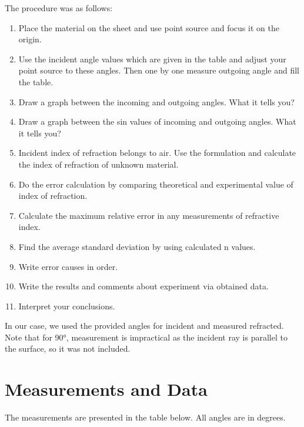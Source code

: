 \documentclass[12pt, a4paper]{article}
\begin{document}
The procedure was as follows:
\begin{enumerate}
\item Place the material on the sheet and use point source and focus it on the origin.
\item Use the incident angle values which are given in the table and adjust your point source to these angles. Then one by one measure outgoing angle and fill the table.
\item Draw a graph between the incoming and outgoing angles. What it tells you?
\item Draw a graph between the sin values of incoming and outgoing angles. What it tells you?
\item Incident index of refraction belongs to air. Use the formulation and calculate the index of refraction of unknown material.
\item Do the error calculation by comparing theoretical and experimental value of index of refraction.
\item Calculate the maximum relative error in any measurements of refractive index.
\item Find the average standard deviation by using calculated n values.
\item Write error causes in order.
\item Write the results and comments about experiment via obtained data.
\item Interpret your conclusions.
\end{enumerate}

In our case, we used the provided angles for incident and measured refracted. Note that for 90°, measurement is impractical as the incident ray is parallel to the surface, so it was not included.

\section{Measurements and Data}
The measurements are presented in the table below. All angles are in degrees.
\end{document}
